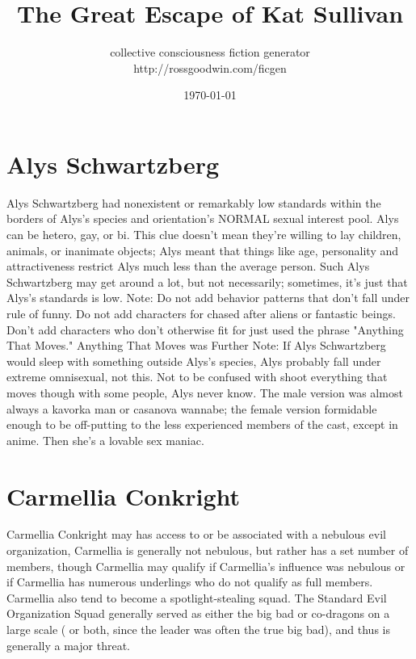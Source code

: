 \documentclass[12pt]{book}
\title{The Great Escape of Kat Sullivan}
\author{collective consciousness fiction generator\\http://rossgoodwin.com/ficgen}
\date{\today}
\begin{document}
\maketitle


\chapter{Alys Schwartzberg}
Alys Schwartzberg had nonexistent or remarkably low standards within the borders of Alys's species and orientation's NORMAL sexual interest pool. Alys can be hetero, gay, or bi. This clue doesn't mean they're willing to lay children, animals, or inanimate objects; Alys meant that things like age, personality and attractiveness restrict Alys much less than the average person. Such Alys Schwartzberg may get around a lot, but not necessarily; sometimes, it's just that Alys's standards is low. Note: Do not add behavior patterns that don't fall under rule of funny. Do not add characters for chased after aliens or fantastic beings. Don't add characters who don't otherwise fit for just used the phrase "Anything That Moves." Anything That Moves was Further Note: If Alys Schwartzberg would sleep with something outside Alys's species, Alys probably fall under extreme omnisexual, not this. Not to be confused with shoot everything that moves  though with some people, Alys never know. The male version was almost always a kavorka man or casanova wannabe; the female version formidable enough to be off-putting to the less experienced members of the cast, except in anime. Then she's a lovable sex maniac.

\chapter{Carmellia Conkright}
Carmellia Conkright may has access to or be associated with a nebulous evil organization, Carmellia is generally not nebulous, but rather has a set number of members, though Carmellia may qualify if Carmellia's influence was nebulous or if Carmellia has numerous underlings who do not qualify as full members. Carmellia also tend to become a spotlight-stealing squad. The Standard Evil Organization Squad generally served as either the big bad or co-dragons on a large scale ( or both, since the leader was often the true big bad), and thus is generally a major threat.
\end{document}
